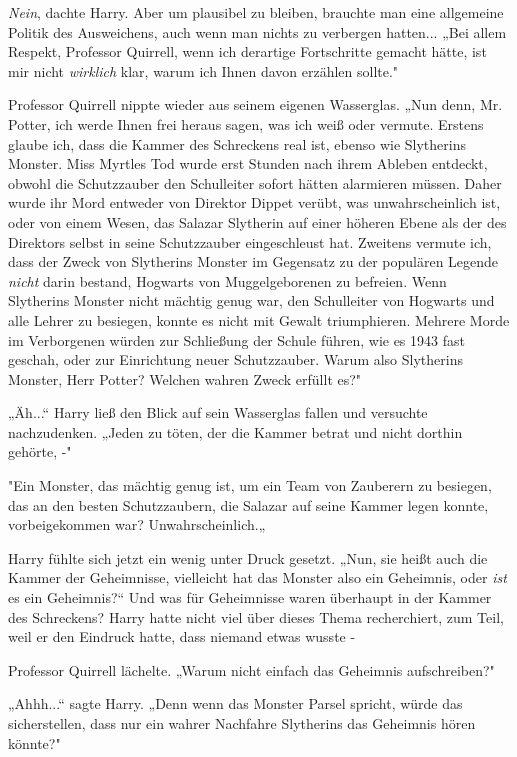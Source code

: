 {\emph{Nein}, dachte Harry. Aber um plausibel zu bleiben, brauchte man eine allgemeine Politik des Ausweichens, auch wenn man nichts zu verbergen hatten... „Bei allem Respekt, Professor Quirrell, wenn ich derartige Fortschritte gemacht hätte, ist mir nicht \emph{wirklich} klar, warum ich Ihnen davon erzählen sollte."

Professor Quirrell nippte wieder aus seinem eigenen Wasserglas. „Nun denn, Mr. Potter, ich werde Ihnen frei heraus sagen, was ich weiß oder vermute. Erstens glaube ich, dass die Kammer des Schreckens real ist, ebenso wie Slytherins Monster. Miss Myrtles Tod wurde erst Stunden nach ihrem Ableben entdeckt, obwohl die Schutzzauber den Schulleiter sofort hätten alarmieren müssen. Daher wurde ihr Mord entweder von Direktor Dippet verübt, was unwahrscheinlich ist, oder von einem Wesen, das Salazar Slytherin auf einer höheren Ebene als der des Direktors selbst in seine Schutzzauber eingeschleust hat. Zweitens vermute ich, dass der Zweck von Slytherins Monster im Gegensatz zu der populären Legende \emph{nicht} darin bestand, Hogwarts von Muggelgeborenen zu befreien. Wenn Slytherins Monster nicht mächtig genug war, den Schulleiter von Hogwarts und alle Lehrer zu besiegen, konnte es nicht mit Gewalt triumphieren. Mehrere Morde im Verborgenen würden zur Schließung der Schule führen, wie es 1943 fast geschah, oder zur Einrichtung neuer Schutzzauber. Warum also Slytherins Monster, Herr Potter? Welchen wahren Zweck erfüllt es?"

„Äh...“ Harry ließ den Blick auf sein Wasserglas fallen und versuchte nachzudenken. „Jeden zu töten, der die Kammer betrat und nicht dorthin gehörte, -"

"Ein Monster, das mächtig genug ist, um ein Team von Zauberern zu besiegen, das an den besten Schutzzaubern, die Salazar auf seine Kammer legen konnte, vorbeigekommen war? Unwahrscheinlich.„

Harry fühlte sich jetzt ein wenig unter Druck gesetzt. „Nun, sie heißt auch die Kammer der Geheimnisse, vielleicht hat das Monster also ein Geheimnis, oder \emph{ist} es ein Geheimnis?“ Und was für Geheimnisse waren überhaupt in der Kammer des Schreckens? Harry hatte nicht viel über dieses Thema recherchiert, zum Teil, weil er den Eindruck hatte, dass niemand etwas wusste -

Professor Quirrell lächelte. „Warum nicht einfach das Geheimnis aufschreiben?"

„Ahhh...“ sagte Harry. „Denn wenn das Monster Parsel spricht, würde das sicherstellen, dass nur ein wahrer Nachfahre Slytherins das Geheimnis hören könnte?"

}
